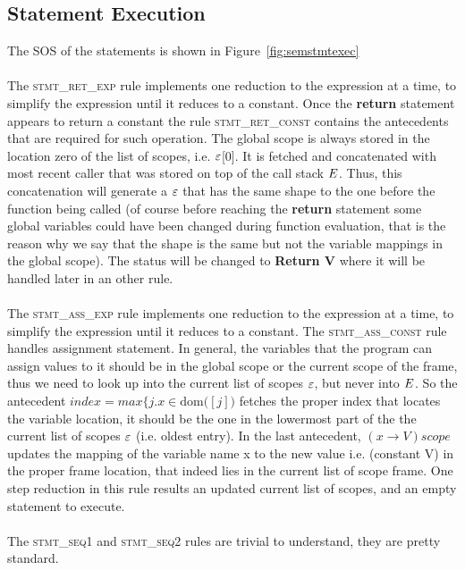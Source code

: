 \documentclass[UTF8]{article}
\begin{document}
\subsection{Statement Execution}
The SOS of the statements is shown in Figure~\ref{fig:semstmtexec}  
\\~\\
The \textsc{stmt\_ret\_exp} rule implements one reduction to the expression at a time, to simplify the expression until it reduces to a constant. 
Once the \textbf{return} statement appears to return a constant the rule \textsc{stmt\_ret\_const} contains the antecedents that are required for such operation. The global scope is always stored in the location zero of the list of scopes, i.e. $\varepsilon$[0]. It is fetched and concatenated with most recent caller that was stored on top of the call stack $E$. Thus, this concatenation will generate a $\varepsilon$ that has the same shape to the one before the function being called (of course before reaching the \textbf{return} statement some global variables could have been changed during function evaluation, that is the reason why we say that the shape is the same but not the variable mappings in the global scope). The status will be changed to \textbf{Return V} where it will be handled later in an other rule. 
\\~\\
The \textsc{stmt\_ass\_exp} rule implements one reduction to the expression at a time, to simplify the expression until it reduces to a constant.
The \textsc{stmt\_ass\_const} rule handles assignment statement. In general, the variables that the program can assign values to it should be in the global scope or the current scope of the frame, thus we need to look up into the current list of scopes $\varepsilon$, but never into $E$. So the antecedent $index = max  \{ j . x  \in \mathrm{dom} ( $\currsf$ [j] ) $ fetches the proper index that locates the variable location, it should be the one in the lowermost part of the the current list of scopes $\varepsilon$ (i.e. oldest entry). In the last antecedent, $ (x \longrightarrow V )scope $ updates the mapping of the variable name x to the new value i.e. (constant V) in the proper frame location, that indeed lies in the current list of scope frame. One step reduction in this rule results an updated current list of scopes, and an empty statement to execute.
\\~\\
The \textsc{stmt\_seq1} and \textsc{stmt\_seq2} rules are trivial to understand, they are pretty standard.
\end{document}
